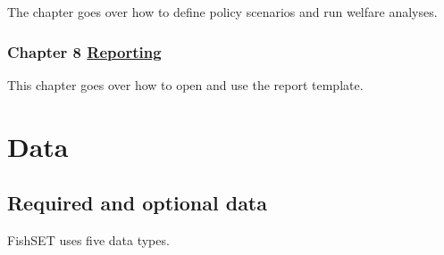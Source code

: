\documentclass[
]{article}
\begin{document}
The chapter goes over how to define policy scenarios and run welfare analyses.

\hypertarget{chapter-8-reporting}{%
\subsubsection{\texorpdfstring{Chapter 8 \protect\hyperlink{reporting}{Reporting}}{Chapter 8 Reporting}}\label{chapter-8-reporting}}

This chapter goes over how to open and use the report template.

\hypertarget{data}{%
\section{Data}\label{data}}

\hypertarget{required-and-optional-data}{%
\subsection{Required and optional data}\label{required-and-optional-data}}

FishSET uses five data types.
\end{document}
